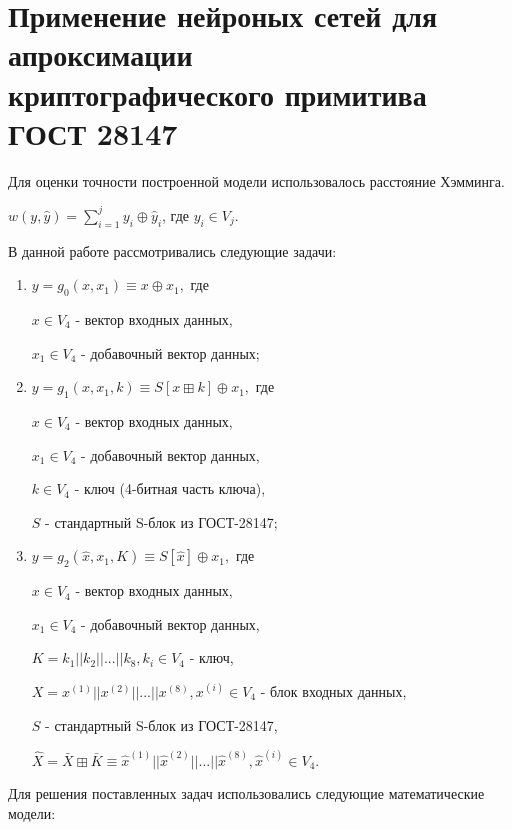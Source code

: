 \documentclass[a4paper,12pt,twoside]{article}
\begin{document}
	\section{Применение нейроных сетей для апроксимации\\ криптографического примитива ГОСТ 28147}
	
	Для оценки точности построенной модели использовалось расстояние Хэмминга.
	
	$w(y, \hat{y}) = \sum_{i=1}^{j} y_i \oplus \hat{y}_i$, где $y_i \in V_j$.

	\bigskip

	\noindent  В данной работе рассмотривались следующие задачи:
	\begin{enumerate}
	\item 
	$y = g_0(x, x_1) \equiv x \oplus x_1,$ где
	
	$x \in V_4$ - вектор входных данных,
	
	$x_1 \in V_4$ - добавочный вектор данных;
	\bigskip
		
	\item 
	$y = g_1(x, x_1, k) \equiv S[x \boxplus k] \oplus x_1,$ где
	
	 $x \in V_4$ - вектор входных данных,
	 
	 $x_1 \in V_4$ - добавочный вектор данных,
	 
	 $k \in V_4$ - ключ (4-битная часть ключа),
	 
	 $S$ - стандартный S-блок из ГОСТ-28147;
	\bigskip
	
	\item 
	$y = g_2(\hat{x}, x_1, K) \equiv S[\hat{x}] \oplus x_1,$ где
	
	$x \in V_4$ - вектор входных данных,
	
	$x_1 \in V_4$ - добавочный вектор данных,
	
	$K=k_1 || k_2 || ... ||k _8, k_i \in V_{4}$ - ключ,
	
	$X=x^{(1)} || x^{(2)} || ... || x^{(8)}, x^{(i)} \in V_{4}$ - блок входных данных,
	
	$S$ - стандартный S-блок из ГОСТ-28147,
	
	$\hat{X} = \bar{X} \boxplus \bar{K} \equiv \hat{x}^{(1)} || \hat{x}^{(2)} || ... || \hat{x}^{(8)}, \hat{x}^{(i)} \in V_{4}$.
	
	\bigskip
	\end{enumerate}
		
	\bigskip
	\noindent Для решения поставленных задач использовались следующие математические модели:
	
\end{document}
